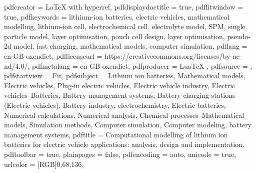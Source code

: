 {    pdfcreator         = {LaTeX with hyperref},
    pdfdisplaydoctitle = true,
    pdffitwindow       = true,
    pdfkeywords        = {lithium-ion batteries, electric vehicles, mathematical modelling, lithium-ion cell, electrochemical cell, electrolyte model, SPM, single particle model, layer optimisation, pouch cell design, layer optimisation, pseudo-2d model, fast charging, mathematical models, computer simulation},
    pdflang            = {en-GB-oxendict},
    pdflicenseurl      = {https://creativecommons.org/licenses/by-nc-nd/4.0/},
    pdfmetalang        = {en-GB-oxendict},
    pdfproducer        = {LuaTeX-\luatexversionused},
    pdfsource          = {},
    pdfstartview       = {Fit},
    pdfsubject         = {Lithium ion batteries, Mathematical models, Electric vehicles, Plug-in electric vehicles, Electric vehicle industry, Electric vehicles--Batteries, Battery management systems, Battery charging stations (Electric vehicles), Battery industry, electrochemistry, Electric batteries, Numerical calculations, Numerical analysis, Chemical processes--Mathematical models, Simulation methods, Computer simulation, Computer modeling, battery management systems},
    pdftitle           = {Computational modelling of lithium ion batteries for electric vehicle applications: analysis, design and implementation},
    pdftoolbar         = true,
    plainpages         = false,
    pdfencoding        = auto,
    unicode            = true,
    urlcolor           = [RGB]{0,68,136}, %
}%



\usepackage{nameref}
\usepackage{algorithm} %
\usepackage{hypcap} %

\usepackage{pdftexcmds} %

\usepackage{glossaries-extra} %

\usepackage{hypdestopt} %

\usepackage{bookmark} %
\usepackage{cleveref}

